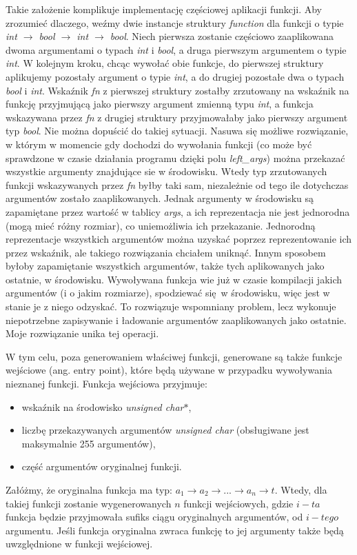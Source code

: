 \documentclass[declaration,shortabstract]{iithesis}
\begin{document}
Takie założenie komplikuje implementację częściowej aplikacji funkcji. Aby 
zrozumieć dlaczego, weźmy dwie instancje struktury \textit{function} dla 
funkcji o typie \textit{int $\rightarrow$ bool $\rightarrow$ int 
$\rightarrow$ bool}. Niech pierwsza zostanie częściowo zaaplikowana dwoma 
argumentami o typach \textit{int} i \textit{bool}, a druga pierwszym argumentem
o typie \textit{int}. W kolejnym kroku, chcąc wywołać obie funkcje, do 
pierwszej struktury aplikujemy pozostały argument o typie \textit{int}, a do 
drugiej pozostałe dwa o typach \textit{bool} i \textit{int}. Wskaźnik \textit
{fn} z pierwszej struktury zostałby zrzutowany na wskaźnik na funkcję 
przyjmującą jako pierwszy argument zmienną typu \textit{int}, a funkcja 
wskazywana przez \textit{fn} z drugiej struktury przyjmowałaby jako pierwszy 
argument typ \textit{bool}. Nie można dopuścić do takiej sytuacji. Nasuwa się 
możliwe rozwiązanie, w którym w momencie gdy dochodzi do wywołania funkcji (co 
może być sprawdzone w czasie działania programu dzięki polu 
\textit{left\_args}) można przekazać wszystkie argumenty znajdujące sie w 
środowisku. Wtedy typ zrzutowanych funkcji wskazywanych przez \textit{fn} byłby 
taki sam, niezależnie od tego ile dotychczas argumentów zostało zaaplikowanych.
Jednak argumenty w środowisku są zapamiętane przez wartość w tablicy \textit
{args}, a ich reprezentacja nie jest jednorodna (mogą mieć różny rozmiar),
co uniemożliwia ich przekazanie.
Jednorodną reprezentacje wszystkich argumentów można uzyskać poprzez 
reprezentowanie ich przez wskaźnik, ale takiego rozwiązania chciałem uniknąć.
Innym sposobem byłoby zapamiętanie wszystkich argumentów, także tych 
aplikowanych jako ostatnie, w środowisku. Wywoływana funkcja wie już w czasie 
kompilacji jakich argumentów (i o jakim rozmiarze), spodziewać się w środowisku,
więc jest w stanie je z niego odzyskać. To rozwiązuje wspomniany 
problem, lecz wykonuje niepotrzebne zapisywanie i ładowanie argumentów 
zaaplikowanych jako ostatnie. Moje rozwiązanie unika tej operacji. 

W tym celu, poza generowaniem właściwej funkcji, generowane są także funkcje 
wejściowe (ang. entry point), które będą używane w przypadku wywoływania 
nieznanej funkcji. 
Funkcja wejściowa przyjmuje: 
\begin{itemize}
  \item wskaźnik na środowisko \textit{unsigned char$\ast$},
  \item liczbę przekazywanych argumentów \textit{unsigned char} 
  (obsługiwane jest maksymalnie 255 argumentów),
  \item część argumentów oryginalnej funkcji.
\end{itemize}
Załóżmy, że oryginalna funkcja ma typ: $a_1 \rightarrow a_2 \rightarrow ...
\rightarrow a_n \rightarrow t$. Wtedy, dla takiej funkcji zostanie wygenerowanych $n$ funkcji 
wejściowych, gdzie $i-ta$ funkcja będzie przyjmowała sufiks ciągu oryginalnych
argumentów, od $i-tego$ argumentu. Jeśli funkcja oryginalna zwraca funkcję to 
jej argumenty także będą uwzględnione w funkcji wejściowej.
\end{document}
